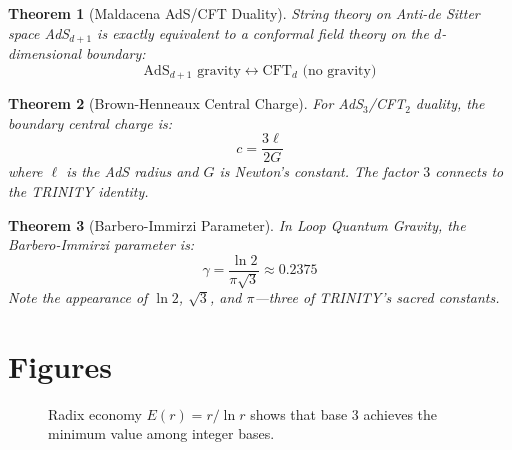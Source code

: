 \documentclass[aps,prd,preprint,superscriptaddress,showpacs,nofootinbib,longbibliography]{revtex4-2}
\newtheorem{theorem}{Theorem}
\begin{document}
\begin{theorem}[Maldacena AdS/CFT Duality]
\label{thm:ads_cft}
String theory on Anti-de Sitter space AdS$_{d+1}$ is exactly equivalent to a conformal field theory on the $d$-dimensional boundary:
\begin{equation}
\text{AdS}_{d+1} \text{ gravity} \leftrightarrow \text{CFT}_d \text{ (no gravity)}
\end{equation}
\end{theorem}

\begin{theorem}[Brown-Henneaux Central Charge]
\label{thm:central_charge}
For AdS$_3$/CFT$_2$ duality, the boundary central charge is:
\begin{equation}
c = \frac{3\ell}{2G}
\end{equation}
where $\ell$ is the AdS radius and $G$ is Newton's constant. The factor $3$ connects to the TRINITY identity.
\end{theorem}

\begin{theorem}[Barbero-Immirzi Parameter]
\label{thm:barbero}
In Loop Quantum Gravity, the Barbero-Immirzi parameter is:
\begin{equation}
\gamma = \frac{\ln 2}{\pi\sqrt{3}} \approx 0.2375
\end{equation}
Note the appearance of $\ln 2$, $\sqrt{3}$, and $\pi$---three of TRINITY's sacred constants.
\end{theorem}

\section{Figures}
\label{sec:figures}

\begin{figure}[h]
\centering
{}
\caption{Radix economy $E(r) = r/\ln r$ shows that base 3 achieves the minimum value among integer bases.}
\label{fig:radix_economy}
\end{figure}
\end{document}
